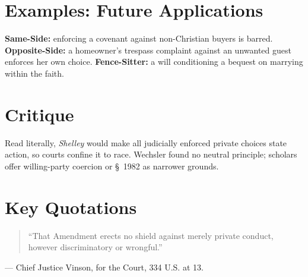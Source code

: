 \documentclass[12pt]{article}
\begin{document}
\section{Examples: Future Applications}
\textbf{Same-Side:} enforcing a covenant against non-Christian buyers is barred. \textbf{Opposite-Side:} a homeowner's trespass complaint against an unwanted guest enforces her own choice. \textbf{Fence-Sitter:} a will conditioning a bequest on marrying within the faith.

\section{Critique}
Read literally, \textit{Shelley} would make all judicially enforced private choices state action, so courts confine it to race. Wechsler found no neutral principle; scholars offer willing-party coercion or \S~1982 as narrower grounds.

\section{Key Quotations}
\begin{quote}
``That Amendment erects no shield against merely private conduct, however discriminatory or wrongful.''
\end{quote}
\noindent --- Chief Justice Vinson, for the Court, 334 U.S. at 13.
\end{document}
